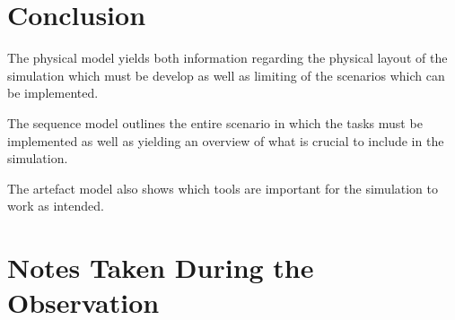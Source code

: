 \documentclass[paper=a4, fontsize=11pt]{scrartcl} %
\numberwithin{equation}{section} %
\numberwithin{figure}{section} %
\numberwithin{table}{section} %
\begin{document}
\section{Conclusion}
The physical model yields both information regarding the physical layout of the simulation which must be develop as well as limiting of the scenarios which can be implemented. 

The sequence model outlines the entire scenario in which the tasks must be implemented as well as yielding an overview of what is crucial to include in the simulation.

The artefact model also shows which tools are important for the simulation to work as intended.

\newpage

\appendix %
\section{Notes Taken During the Observation}
\end{document}
